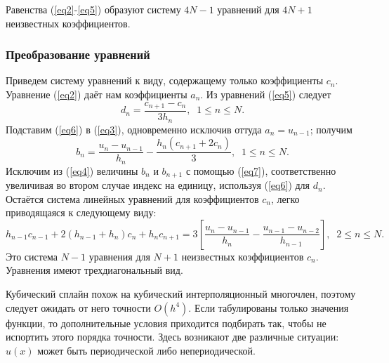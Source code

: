 \documentclass[
11pt,
master, %
subf, %
href, %
colorlinks=true, %
times, %
]{disser}
\begin{document}
Равенства (\ref{eq2}-\ref{eq5}) образуют систему $4N-1$ уравнений для $4N+1$ неизвестных коэффициентов.

\subsubsection{Преобразование уравнений}
Приведем систему уравнений к виду, содержащему только коэффициенты $c_n$. Уравнение (\ref{eq2}) даёт нам коэффициенты $a_n$. Из уравнений (\ref{eq5}) следует
\begin{equation}\label{eq6}
  d_n = \frac{c_{n+1}-c_n}{3h_n},\;\;1\leq n\leq N.
\end{equation}
Подставим (\ref{eq6}) в (\ref{eq3}), одновременно исключив оттуда $a_n=u_{n-1}$; получим
\begin{equation}\label{eq7}
  b_n = \frac{u_n-u_{n-1}}{h_n}-\frac{h_n(c_{n+1}+2c_n)}{3},\;\;1\leq n\leq N.
\end{equation}
Исключим из (\ref{eq4}) величины $b_n$ и $b_{n+1}$ с помощью (\ref{eq7}), соответственно увеличивая во втором случае индекс на единицу, используя (\ref{eq6}) для $d_n$. Остаётся система линейных уравнений для коэффициентов $c_n$, легко приводящаяся к следующему виду:
\begin{equation}\label{eq8}
  h_{n-1}c_{n-1} + 2(h_{n-1}+h_n)c_n + h_n c_{n+1} =3\left[\frac{u_n-u_{n-1}}{h_n}-\frac{u_{n-1}-u_{n-2}}{h_{n-1}}\right],\;\;2\leq n\leq N.
\end{equation}
Это система $N-1$ уравнения для $N+1$ неизвестных коэффициентов $c_n$. Уравнения имеют трехдиагональный вид.

Кубический сплайн похож на кубический интерполяционный многочлен, поэтому следует ожидать от него точности $O(h^4)$. Если табулированы только значения функции, то дополнительные условия приходится подбирать так, чтобы не испортить этого порядка точности. Здесь возникают две различные ситуации: $u(x)$ может быть периодической либо непериодической.
\end{document}
